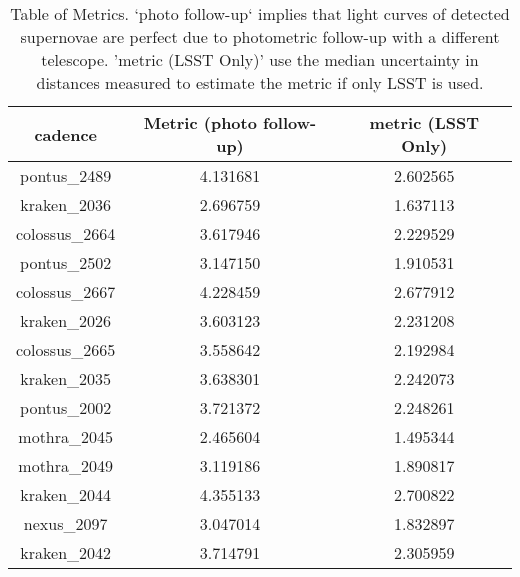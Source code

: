 \begin{table}
\begin{centering}
\begin{tabular}{|c|c|c|}
    \hline
     cadence &  Metric (photo follow-up) &  metric (LSST Only) \\
     \hline
     pontus\_2489 &         4.131681 &     2.602565 \\
     kraken\_2036 &         2.696759 &     1.637113 \\
   colossus\_2664 &         3.617946 &     2.229529 \\
     pontus\_2502 &         3.147150 &     1.910531 \\
   colossus\_2667 &         4.228459 &     2.677912 \\
     kraken\_2026 &         3.603123 &     2.231208 \\
   colossus\_2665 &         3.558642 &     2.192984 \\
     kraken\_2035 &         3.638301 &     2.242073 \\
     pontus\_2002 &         3.721372 &     2.248261 \\
     mothra\_2045 &         2.465604 &     1.495344 \\
     mothra\_2049 &         3.119186 &     1.890817 \\
     kraken\_2044 &         4.355133 &     2.700822 \\
      nexus\_2097 &         3.047014 &     1.832897 \\
     kraken\_2042 &         3.714791 &     2.305959 \\
     \hline
\end{tabular}
\end{centering}
\caption{Table of Metrics. `photo follow-up` implies that light curves of detected supernovae are perfect due to photometric follow-up with a different telescope. 'metric (LSST Only)' use the median uncertainty in distances measured to estimate the metric if only LSST is used.}
\label{tab:cadence_metrics}
\end{table}
